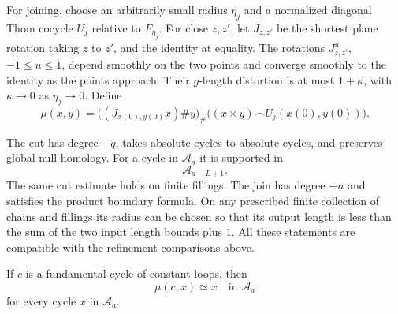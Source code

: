 For joining, choose an arbitrarily small radius $\eta_j$ and a
normalized diagonal Thom cocycle $U_j$ relative to $F_{\eta_j}$.
For close $z,z'$, let $J_{z,z'}$ be the shortest plane rotation
taking $z$ to $z'$, and the identity at equality.  The rotations
$J_{z,z'}^u$, $-1\le u\le1$, depend smoothly on the two points
and converge smoothly to the identity as the points approach.
Their $g$-length distortion is at most $1+\kappa$, with
$\kappa\to0$ as $\eta_j\to0$.  Define
\begin{equation}\label{eq:cj-join-definition}
 \mu(x,y)=\bigl((J_{x(0),y(0)}x)\#y\bigr)_\#
 \bigl((x\times y)\frown U_j(x(0),y(0))\bigr).
\end{equation}

\begin{lemma}\label{lem:cj-operations}
The cut has degree $-q$, takes absolute cycles to absolute cycles,
and preserves global null-homology.  For a cycle in $\mathcal A_a$ it is
supported in
\begin{equation}\label{eq:cj-cut-bound}
 \mathcal A_{a-L+1}.
\end{equation}
The same cut estimate holds on finite fillings.  The join has degree
$-n$ and satisfies the product boundary formula.  On any prescribed
finite collection of chains and fillings its radius can be chosen
so that its output length is less than the sum of the two input
length bounds plus $1$.  All these statements are compatible with
the refinement comparisons above.

If $c$ is a fundamental cycle of constant loops, then
\begin{equation}\label{eq:cj-chain-unit}
 \mu(c,x)\simeq x\quad\text{in }\mathcal A_a
\end{equation}
for every cycle $x$ in $\mathcal A_a$.
\end{lemma}

